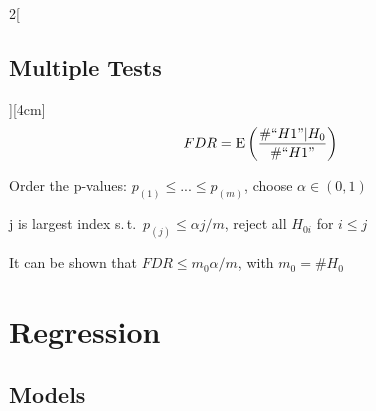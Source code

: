 \documentclass[8pt]{extarticle}
\begin{document}
\begin{multicols}{2}[\subsection{Multiple Tests}][4cm]
$$FDR = \mathrm{E}\left(\frac{\#``H1"|H_0}{\#``H1"}\right)$$

\noindent Order the p-values: $p_{(1)} \leq...\leq p_{(m)} $, choose $\alpha\in(0,1)$

\noindent j is largest index s.\,t.\ $p_{(j)} \leq \alpha j/m$, reject all $H_{0i}$ for $i\leq j$

\vspace{1em}
It can be shown that $FDR \leq m_0\alpha/m$, with $m_0 = \# H_0$

\end{multicols}






\section{Regression}



\subsection{Models}
\end{document}

